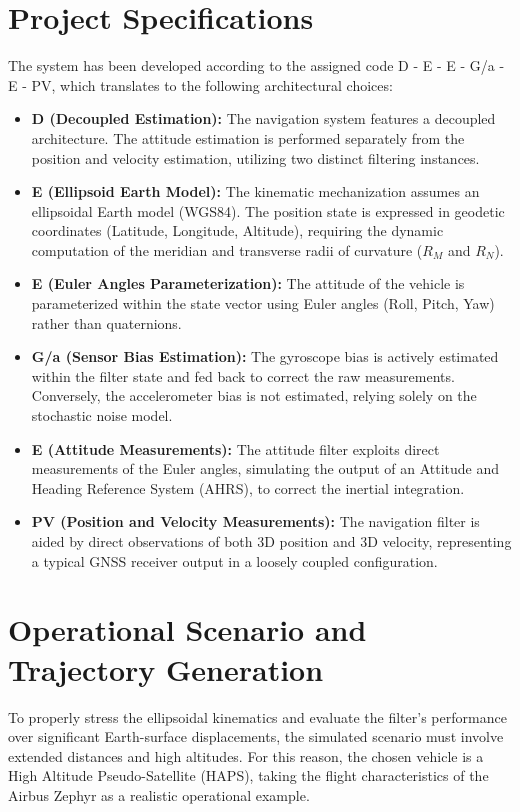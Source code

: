 \documentclass[a4paper,twoside,openany]{report}
\begin{document}
\section{Project Specifications}

The system has been developed according to the assigned code D - E - E - G/a - E - PV, which translates to the following architectural choices:

\begin{itemize}
    \item \textbf{D (Decoupled Estimation):} The navigation system features a decoupled architecture. The attitude estimation is performed separately from the position and velocity estimation, utilizing two distinct filtering instances.
    \item \textbf{E (Ellipsoid Earth Model):} The kinematic mechanization assumes an ellipsoidal Earth model (WGS84). The position state is expressed in geodetic coordinates (Latitude, Longitude, Altitude), requiring the dynamic computation of the meridian and transverse radii of curvature ($R_M$ and $R_N$).
    \item \textbf{E (Euler Angles Parameterization):} The attitude of the vehicle is parameterized within the state vector using Euler angles (Roll, Pitch, Yaw) rather than quaternions.
    \item \textbf{G/a (Sensor Bias Estimation):} The gyroscope bias is actively estimated within the filter state and fed back to correct the raw measurements. Conversely, the accelerometer bias is not estimated, relying solely on the stochastic noise model.
    \item \textbf{E (Attitude Measurements):} The attitude filter exploits direct measurements of the Euler angles, simulating the output of an Attitude and Heading Reference System (AHRS), to correct the inertial integration.
    \item \textbf{PV (Position and Velocity Measurements):} The navigation filter is aided by direct observations of both 3D position and 3D velocity, representing a typical GNSS receiver output in a loosely coupled configuration.
\end{itemize}

\section{Operational Scenario and Trajectory Generation}

To properly stress the ellipsoidal kinematics and evaluate the filter's performance over significant Earth-surface displacements, the simulated scenario must involve extended distances and high altitudes. For this reason, the chosen vehicle is a High Altitude Pseudo-Satellite (HAPS), taking the flight characteristics of the Airbus Zephyr as a realistic operational example.
\end{document}
